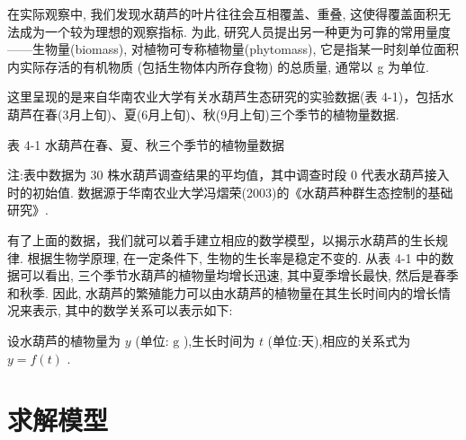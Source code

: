 \documentclass[10pt]{article}
\begin{document}
在实际观察中, 我们发现水葫芦的叶片往往会互相覆盖、重叠, 这使得覆盖面积无法成为一个较为理想的观察指标. 为此, 研究人员提出另一种更为可靠的常用量度——生物量(biomass), 对植物可专称植物量(phytomass), 它是指某一时刻单位面积内实际存活的有机物质 (包括生物体内所存食物) 的总质量, 通常以 g 为单位.

这里呈现的是来自华南农业大学有关水葫芦生态研究的实验数据(表 4-1)，包括水葫芦在春(3月上旬)、夏(6月上旬)、秋(9月上旬)三个季节的植物量数据.

表 4-1 水葫芦在春、夏、秋三个季节的植物量数据

\begin{center}
\end{center}

注:表中数据为 30 株水葫芦调查结果的平均值，其中调查时段 0 代表水葫芦接入时的初始值. 数据源于华南农业大学冯熠荣(2003)的《水葫芦种群生态控制的基础研究》.

有了上面的数据，我们就可以着手建立相应的数学模型，以揭示水葫芦的生长规律. 根据生物学原理, 在一定条件下, 生物的生长率是稳定不变的. 从表 4-1 中的数据可以看出, 三个季节水葫芦的植物量均增长迅速, 其中夏季增长最快, 然后是春季和秋季. 因此, 水葫芦的繁殖能力可以由水葫芦的植物量在其生长时间内的增长情况来表示, 其中的数学关系可以表示如下:

设水葫芦的植物量为 \(y\) (单位: \(\mathrm{g}\) ),生长时间为 \(t\) (单位:天),相应的关系式为 \(y = f\left( t\right)\) .

\section*{求解模型}
\end{document}
